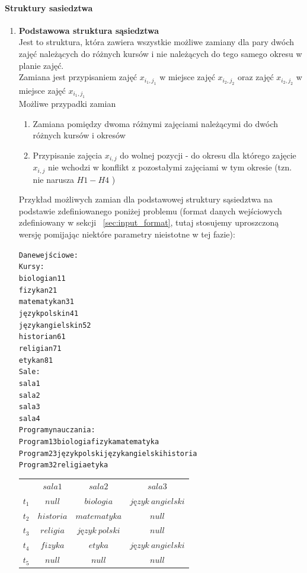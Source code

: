 \paragraph{Struktury sasiedztwa}
\begin{enumerate}
\item \textbf{Podstawowa struktura sąsiedztwa} \\
Jest to struktura, która zawiera wszystkie możliwe zamiany dla pary dwóch zajęć należących do różnych kursów i nie należących do tego samego okresu w planie zajęć. \\
Zamiana jest przypisaniem zajęć $x_{i_{1},j_{1}}$ w miejsce zajęć ${x_{i_{2}, j_{2}}}$ oraz zajęć ${x_{i_{2}, j_{2}}}$ w miejsce zajęć $x_{i_{1},j_{1}}$ \\
Możliwe przypadki zamian

\begin{enumerate}
\item Zamiana pomiędzy dwoma różnymi zajęciami należącymi do dwóch różnych kursów i okresów
\item Przypisanie zajęcia ${x_{i,j}}$ do wolnej pozycji - do okresu dla którego zajęcie ${x_{i,j}}$ nie wchodzi w konflikt z pozostałymi zajęciami w tym okresie (tzn. nie narusza ${H1-H4}$ )
\end{enumerate}
Przykład możliwych zamian dla podstawowej struktury sąsiedztwa na podstawie zdefiniowanego poniżej problemu (format danych wejściowych zdefiniowany w sekcji ~\ref{sec:input_format}, tutaj stosujemy uproszczoną wersję pomijając niektóre parametry nieistotne w tej fazie):
\begin{alltt}
Dane wejściowe:
Kursy: 
biologia n1 1
fizyka n2 1
matematyka n3 1
język polski n4 1
język angielski n5 2
historia n6 1
religia n7 1
etyka n8 1
Sale: 
sala1
sala2
sala3
sala4
Programy nauczania:
Program1 3 biologia fizyka matematyka
Program2 3 język polski język angielski historia
Program3 2 religia etyka
\end{alltt}

\begin{table}[H]
\begin{center}
\begin{tabular}{ r|c|c|c| }
\multicolumn{1}{r}{}
 &  \multicolumn{1}{c}{$sala1$}
 & \multicolumn{1}{c}{$sala2$} 
 & \multicolumn{1}{c}{$sala3$} 
 \\
\cline{2-4}
$t_{1}$ & $null$ & $biologia$ & $język\ angielski$  \\
\cline{2-4}
$t_{2}$ & $historia$ & $matematyka$  & $null$ \\
\cline{2-4}
$t_{3}$ & $religia$ & $język\ polski$  & $null$ \\
\cline{2-4}
$t_{4}$ & $fizyka$ & $etyka$ & $język\ angielski$ \\
\cline{2-4}
$t_{5}$ & $null$ & $null$ & $null$ \\
\cline{2-4}
\end{tabular}
\end{center}


\end{table}
\end{enumerate}
